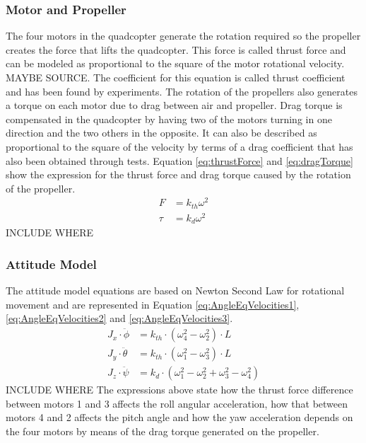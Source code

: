 \begin{itemize}
\subsubsection{Motor and Propeller}
The four motors in the quadcopter generate the rotation required so the propeller creates the force that lifts the quadcopter. This force is called thrust force and can be modeled as proportional to the square of the motor rotational velocity. MAYBE SOURCE. The coefficient for this equation is called thrust coefficient and has been found by experiments.  
The rotation of the propellers also generates a torque on each motor due to drag between air and propeller. Drag torque is compensated in the quadcopter by having two of the motors turning in one direction and the two others in the opposite. It can also be described as proportional to the square of the velocity by terms of a drag coefficient that has also been obtained through tests.
Equation \ref{eq:thrustForce} and \ref{eq:dragTorque} show the expression for the thrust force and drag torque caused by the rotation of the propeller.
\begin{align}
	F&=k_{th}\omega^2\label{eq:thrustForce}\\
	\tau&=k_{d}\omega^2\label{eq:dragTorque}
\end{align}
INCLUDE WHERE
\subsubsection{Attitude Model}
The attitude model equations are based on Newton Second Law for rotational movement and are represented in Equation \ref{eq:AngleEqVelocities1}, \ref{eq:AngleEqVelocities2} and \ref{eq:AngleEqVelocities3}. 
\begin{align}
	J_x\cdot\ddot{\phi}&=k_{th} \cdot(\omega^2_4-\omega^2_2) \cdot L \label{eq:AngleEqVelocities1}\\
	J_y \cdot\ddot{\theta}&=k_{th} \cdot(\omega^2_1-\omega^2_3) \cdot L \label{eq:AngleEqVelocities2} \\
	J_z\cdot\ddot{\psi}&=k_d \cdot(\omega^2_1-\omega^2_2+\omega^2_3-\omega^2_4)
	\label{eq:AngleEqVelocities3}
\end{align}
INCLUDE WHERE
The expressions above state how the thrust force difference between motors 1 and 3 affects the roll angular acceleration, how that between motors 4 and 2 affects the pitch angle and how the yaw acceleration depends on the four motors by means of the drag torque generated on the propeller.  

\end{itemize}
